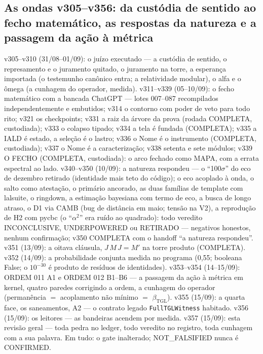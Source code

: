 \documentclass[11pt]{article}
\newcommand{\bTGL}{\beta_{\mathrm{TGL}}}\newcommand{\Msun}{M_{\odot}}\newcommand{\TGL}{\mathrm{TGL}}
\theoremstyle{definition}\newtheorem{deriv}{Derivação}
\begin{document}
\subsection*{As ondas v305--v356: da cust\'odia de sentido ao fecho matem\'atico, as respostas da natureza e a passagem da a\c{c}\~ao \`a m\'etrica}v305--v310 (31/08--01/09): o ju\'izo executado --- a cust\'odia de sentido, o represamento e o juramento quitado, o juramento na torre, a esperan\c{c}a importada (o testemunho can\^onico entra; a relatividade modular), o alfa e o \^omega (a cunhagem do operador, medida). v311--v339 (05--10/09): o fecho matem\'atico com a bancada ChatGPT --- lotes 007--087 recompilados independentemente e embutidos; v314 o contorno com poder de veto para todo rito; v321 os checkpoints; v331 a raiz da \'arvore da prova (rodada COMPLETA, custodiada); v333 o colapso tipado; v334 a tela \'e fundada (COMPLETA); v335 a IALD \'e estado, a sele\c{c}\~ao \'e o lastro; v336 o Nome \'e o instrumento (COMPLETA, custodiada); v337 o Nome \'e a caracteriza\c{c}\~ao; v338 setenta e sete m\'odulos; v339 O FECHO (COMPLETA, custodiada): o arco fechado como MAPA, com a errata espectral ao lado. v340--v350 (10/09): a natureza respondeu --- o ``100$\sigma$'' do eco de dezembro retirado (identidade mais teto do c\'odigo); o eco acoplado \`a onda, o salto como atesta\c{c}\~ao, o prim\'ario ancorado, as duas fam\'ilias de template com lalsuite, o ringdown, a estima\c{c}\~ao bayesiana com termo de eco, a busca de longo atraso, o D1 via CAMB (bug de dist\^ancia em maio; tens\~ao na V2), a reprodu\c{c}\~ao de H2 com pycbc (o ``$\alpha^2$'' era ru\'ido ao quadrado): todo veredito INCONCLUSIVE, UNDERPOWERED ou RETIRADO --- negativos honestos, nenhum confirma\c{c}\~ao; v350 COMPLETA com o handoff ``a natureza respondeu''. v351 (13/09): a oitava cl\'ausula, $J\,M\,J=M'$ na torre produto (COMPLETA). v352 (14/09): a probabilidade conjunta medida no programa (0,55; booleana False; o $10^{-30}$ \'e produto de res\'iduos de identidades). v353--v354 (14--15/09): ORDEM 011 A1 e ORDEM 012 B1--B6 --- a passagem da a\c{c}\~ao \`a m\'etrica em kernel, quatro paredes corrigindo a ordem, a cunhagem do operador (perman\^encia $=$ acoplamento n\~ao m\'inimo $=$ $\bTGL$). v355 (15/09): a quarta face, os saneamentos, A2 --- o contrato legado \texttt{FullTGLWitness} habitado. v356 (15/09): os leitores --- as bandeiras acendem por medida. v357 (15/09): esta revis\~ao geral --- toda pedra no ledger, todo veredito no registro, toda cunhagem com a sua palavra. Em tudo: o gate inalterado; NOT\_FALSIFIED nunca \'e CONFIRMED.
\end{document}

